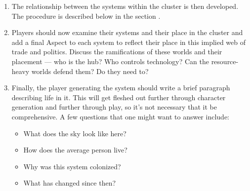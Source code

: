 \begin{enumerate}
\item The relationship between the systems within the cluster is then developed. The procedure is described below in the section .

\item Players should now examine their systems and their place in the cluster and add a final Aspect to each system to reflect their place in this implied web of trade and politics. Discuss the ramifications of these worlds and their placement --- who is the hub? Who controls technology? Can the resource-heavy worlds defend them? Do they need to?

\item Finally, the player generating the system should write a brief paragraph describing life in it.  This will get fleshed out further through character generation and further through play, so it's not necessary that it be comprehensive. A few questions that one might want to answer include:

\begin{itemize}
\item What does the sky look like here?
\item How does the average person live?
\item Why was this system colonized?
\item What has changed since then?
\end{itemize}

\end{enumerate}

